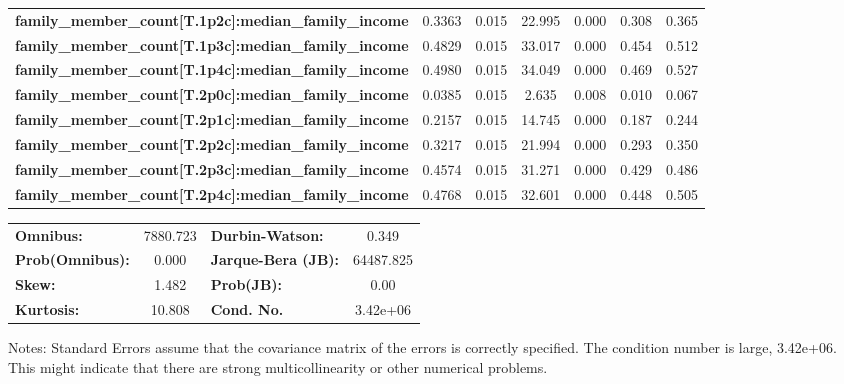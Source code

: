 \documentclass{report}
\begin{document}
\begin{center}
\begin{tabular}{lcccccc}
\textbf{family\_member\_count[T.1p2c]:median\_family\_income} &       0.3363  &        0.015     &    22.995  &         0.000        &        0.308    &        0.365     \\
\textbf{family\_member\_count[T.1p3c]:median\_family\_income} &       0.4829  &        0.015     &    33.017  &         0.000        &        0.454    &        0.512     \\
\textbf{family\_member\_count[T.1p4c]:median\_family\_income} &       0.4980  &        0.015     &    34.049  &         0.000        &        0.469    &        0.527     \\
\textbf{family\_member\_count[T.2p0c]:median\_family\_income} &       0.0385  &        0.015     &     2.635  &         0.008        &        0.010    &        0.067     \\
\textbf{family\_member\_count[T.2p1c]:median\_family\_income} &       0.2157  &        0.015     &    14.745  &         0.000        &        0.187    &        0.244     \\
\textbf{family\_member\_count[T.2p2c]:median\_family\_income} &       0.3217  &        0.015     &    21.994  &         0.000        &        0.293    &        0.350     \\
\textbf{family\_member\_count[T.2p3c]:median\_family\_income} &       0.4574  &        0.015     &    31.271  &         0.000        &        0.429    &        0.486     \\
\textbf{family\_member\_count[T.2p4c]:median\_family\_income} &       0.4768  &        0.015     &    32.601  &         0.000        &        0.448    &        0.505     \\
\bottomrule
\end{tabular}
\begin{tabular}{lclc}
\textbf{Omnibus:}       & 7880.723 & \textbf{  Durbin-Watson:     } &     0.349  \\
\textbf{Prob(Omnibus):} &   0.000  & \textbf{  Jarque-Bera (JB):  } & 64487.825  \\
\textbf{Skew:}          &   1.482  & \textbf{  Prob(JB):          } &      0.00  \\
\textbf{Kurtosis:}      &  10.808  & \textbf{  Cond. No.          } &  3.42e+06  \\
\bottomrule
\end{tabular}
\end{center}

Notes: \newline
 [1] Standard Errors assume that the covariance matrix of the errors is correctly specified. \newline
 [2] The condition number is large, 3.42e+06. This might indicate that there are \newline
 strong multicollinearity or other numerical problems.
\end{document}
